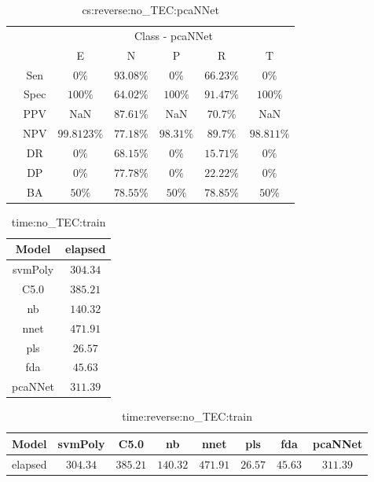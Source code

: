\begin{table}[!ht]
	\centering
	\begin{tabular}{|c|c|c|c|c|c|c|}
		\cline{3-7}
		\multicolumn{2}{c|}{} & \multicolumn{5}{c|}{Class - pcaNNet} \\ \cline{3-7}
		\multicolumn{2}{c|}{} & E & N & P & R & T \\ \hline
		\multirow{7}{*}{\rotatebox{90}{Statistics}} & Sen & $0\%$ & $93.08\%$ & $0\%$ & $66.23\%$ & $0\%$ \\ \cline{2-7}
		 & Spec & $100\%$ & $64.02\%$ & $100\%$ & $91.47\%$ & $100\%$ \\ \cline{2-7}
		 & PPV & NaN & $87.61\%$ & NaN & $70.7\%$ & NaN \\ \cline{2-7}
		 & NPV & $99.8123\%$ & $77.18\%$ & $98.31\%$ & $89.7\%$ & $98.811\%$ \\ \cline{2-7}
		 & DR & $0\%$ & $68.15\%$ & $0\%$ & $15.71\%$ & $0\%$ \\ \cline{2-7}
		 & DP & $0\%$ & $77.78\%$ & $0\%$ & $22.22\%$ & $0\%$ \\ \cline{2-7}
		 & BA & $50\%$ & $78.55\%$ & $50\%$ & $78.85\%$ & $50\%$ \\ \hline
	\end{tabular}
	\caption{cs:reverse:no_TEC:pcaNNet}
	\label{tab:cs:reverse:no_TEC:pcaNNet}
\end{table}

\begin{table}[!ht]
	\centering
	\begin{tabular}{|c|c|}
		\hline
		Model & elapsed \\ \hline
		svmPoly & $304.34$ \\ \hline
		C5.0 & $385.21$ \\ \hline
		nb & $140.32$ \\ \hline
		nnet & $471.91$ \\ \hline
		pls & $26.57$ \\ \hline
		fda & $45.63$ \\ \hline
		pcaNNet & $311.39$ \\ \hline
	\end{tabular}
	\caption{time:no_TEC:train}
	\label{tab:time:no_TEC:train}
\end{table}

\begin{table}[!ht]
	\centering
	\begin{tabular}{|c|c|c|c|c|c|c|c|}
		\hline
		Model & svmPoly & C5.0 & nb & nnet & pls & fda & pcaNNet \\ \hline
		elapsed & $304.34$ & $385.21$ & $140.32$ & $471.91$ & $26.57$ & $45.63$ & $311.39$ \\ \hline
	\end{tabular}
	\caption{time:reverse:no_TEC:train}
	\label{tab:time:reverse:no_TEC:train}
\end{table}

